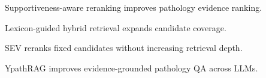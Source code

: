 \begin{highlights}
\item Supportiveness-aware reranking improves pathology evidence ranking.
\item Lexicon-guided hybrid retrieval expands candidate coverage.
\item SEV reranks fixed candidates without increasing retrieval depth.
\item YpathRAG improves evidence-grounded pathology QA across LLMs.
\end{highlights}
